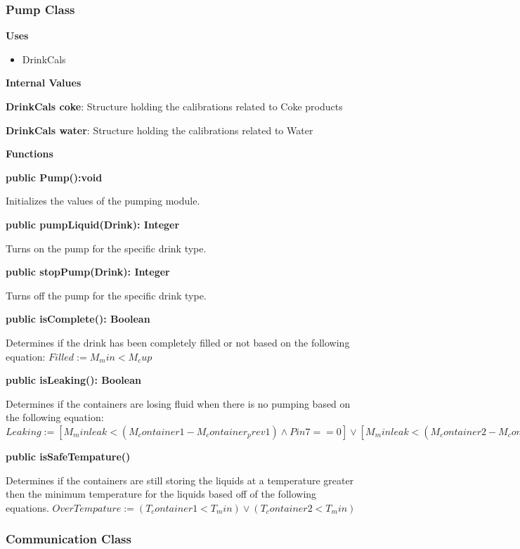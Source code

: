 \documentclass [10pt]{article}
\begin{document}

\subsubsection{Pump Class}

\textbf{Uses}

\begin{itemize}
	\item DrinkCals
\end{itemize}

\textbf{Internal Values}

\textbf{DrinkCals coke}: Structure holding the calibrations related to Coke products

\textbf{DrinkCals water}: Structure holding the calibrations related to Water

\textbf{Functions}

\textbf{public Pump():void}

Initializes the values of the pumping module.

\textbf{public pumpLiquid(Drink): Integer}

Turns on the pump for the specific drink type.

\textbf{public stopPump(Drink): Integer}

Turns off the pump for the specific drink type.

\textbf{public isComplete(): Boolean}

Determines if the drink has been completely filled or not based on the following equation:
$Filled := M_min < M_cup$

\textbf{public isLeaking(): Boolean}

Determines if the containers are losing fluid when there is no pumping based on the following equation:
$Leaking := [M_minleak < (M_container1 - M_container_prev1) \wedge Pin7 ==0] \vee [M_minleak < (M_container2 - M_container_prev2) \wedge Pin8 ==0] $

\textbf{public isSafeTempature()}

Determines if the containers are still storing the liquids at a temperature greater then the minimum temperature for the liquids based off of the following equations.
$OverTempature := (T_container1 < T_min) \vee (T_container2 < T_min)$ 


\subsubsection{Communication Class}
\end{document}
